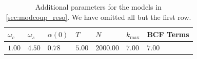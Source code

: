 \begin{table}[H]
  \centering
  \begin{tabular}{lllllll}
  \toprule
   $ω_c$   & $ω_s$   & $α(0)$   & $T$    & $N$       & $k_{\mathrm{max}}$   & BCF Terms   \\
  \midrule
   $1.00$  & $4.50$  & $0.78$   & $5.00$ & $2000.00$ & $7.00$
                                                                            & $7.00$      \\
  \bottomrule
  \end{tabular}
  \caption{\label{tab:plus_tune}Additional parameters for the models
    in \cref{sec:modcoup_reso}.  We have omitted all but the first
    row.}
\end{table}
